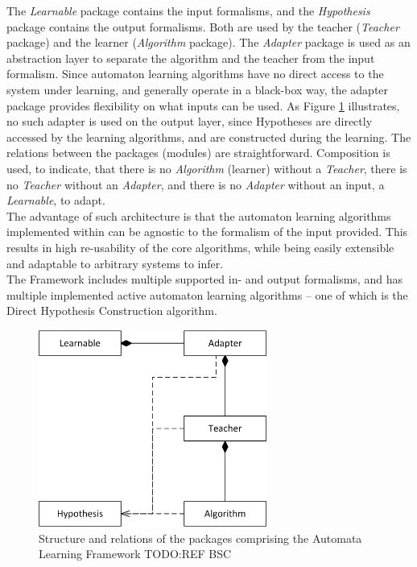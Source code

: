The \textit{Learnable} package contains the input formalisms, and the \textit{Hypothesis} package contains the output formalisms. Both are used by the teacher (\textit{Teacher} package) and the learner (\textit{Algorithm} package). The \textit{Adapter} package is used as an abstraction layer to separate the algorithm and the teacher from the input formalism. Since automaton learning algorithms have no direct access to the system under learning, and generally operate in a black-box way, the adapter package provides flexibility on what inputs can be used. As Figure \ref{fig_automatalearning_packages} illustrates, no such adapter is used on the output layer, since Hypotheses are directly accessed by the learning algorithms, and are constructed during the learning. The relations between the packages (modules) are straightforward.  Composition is used, to indicate, that there is no \textit{Algorithm} (learner) without a \textit{Teacher}, there is no \textit{Teacher} without an \textit{Adapter}, and there is no \textit{Adapter} without an input, a \textit{Learnable}, to adapt. \\
The advantage of such architecture is that the automaton learning algorithms implemented within can be agnostic to the formalism of the input provided. This results in high re-usability of the core algorithms, while being easily extensible and adaptable to arbitrary systems to infer.  \\
The Framework includes multiple supported in- and output formalisms, and has multiple implemented active automaton learning algorithms -- one of which is the Direct Hypothesis Construction algorithm.

\begin{figure}[!ht] 
	\centering
	\includegraphics[width=75mm, keepaspectratio]{figures/automatalearning_packages.png}
	\caption{Structure and relations of the packages comprising the Automata Learning Framework TODO:REF BSC} 
	\label{fig_automatalearning_packages}
\end{figure}

